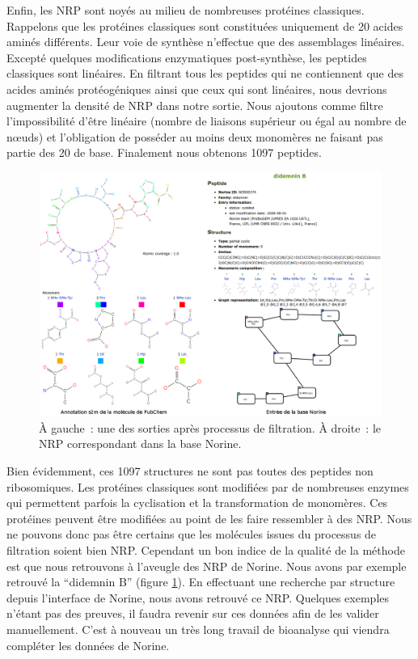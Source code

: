 Enfin, les NRP sont noyés au milieu de nombreuses protéines classiques.
Rappelons que les protéines classiques sont constituées uniquement de 20 acides aminés différents.
Leur voie de synthèse n'effectue que des assemblages linéaires.
Excepté quelques modifications enzymatiques post-synthèse, les peptides classiques sont linéaires.
En filtrant tous les peptides qui ne contiennent que des acides aminés 
protéogéniques ainsi que ceux qui sont linéaires, nous devrions augmenter la densité de NRP dans notre sortie.
Nous ajoutons comme filtre l'impossibilité d'être linéaire (nombre de liaisons supérieur ou égal au nombre de nœuds) et l'obligation de posséder au moins deux monomères ne faisant pas partie des 20 de base.
Finalement nous obtenons 1097 peptides.

\begin{figure}[h!]
  \begin{center}
    \includegraphics[width=450px]{Figures/contributions/didemnin_B.png}
    \caption{\label{didemin}À gauche~: une des sorties après processus de filtration.
    À droite~: le NRP correspondant dans la base Norine.}
  \end{center}
\end{figure}

Bien évidemment, ces 1097 structures ne sont pas toutes des peptides non ribosomiques.
Les protéines classiques sont modifiées par de nombreuses enzymes qui permettent parfois la cyclisation et la transformation de monomères.
Ces protéines peuvent être modifiées au point de les faire ressembler à des NRP.
Nous ne pouvons donc pas être certains que les molécules issues du processus de filtration soient bien NRP.
Cependant un bon indice de la qualité de la méthode est que nous retrouvons à l'aveugle des NRP de Norine.
Nous avons par exemple retrouvé la ``didemnin B'' (figure \ref{didemin}).
En effectuant une recherche par structure depuis l'interface de Norine, nous avons retrouvé ce NRP.
Quelques exemples n'étant pas des preuves, il faudra revenir sur ces données afin de les valider manuellement.
C'est à nouveau un très long travail de bioanalyse qui viendra compléter les données de Norine.



